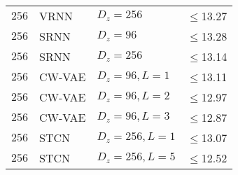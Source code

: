 {\begin{table}[p]
{\begin{tabular}{ll|lr}
        $256$     & VRNN                & $D_z=256$             & $\leq$13.27 \\
        $256$     & SRNN                & $D_z=96$              & $\leq$13.28 \\
        $256$     & SRNN                & $D_z=256$             & $\leq$13.14 \\
        $256$     & CW-VAE              & $D_z=96, L=1$         & $\leq$13.11 \\
        $256$     & CW-VAE              & $D_z=96, L=2$         & $\leq$12.97 \\
        $256$     & CW-VAE              & $D_z=96, L=3$         & $\leq$12.87 \\
        $256$     & STCN                & $D_z=256,L=1$         & $\leq$13.07 \\  %
        $256$     & STCN                & $D_z=256,L=5$         & $\leq$12.52 \\
        \bottomrule
    \end{tabular}%
    }
    \label{tab: timit likelihoods dmol mu-law appendix}
\end{table}


}

